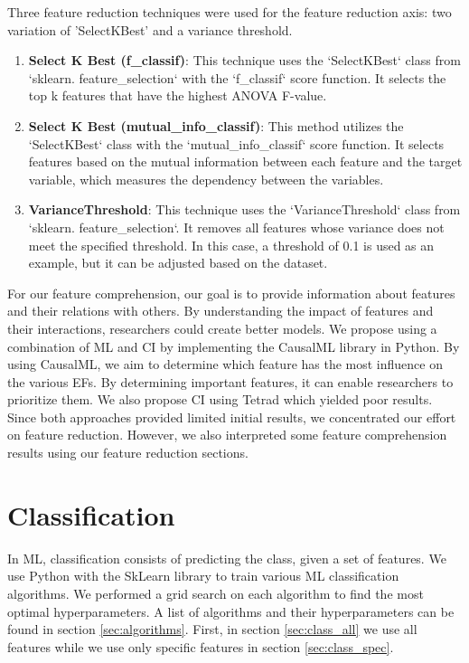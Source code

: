 \documentclass[12pt,letterpaper]{article}
\begin{document}
Three feature reduction techniques were used for the feature reduction axis: two variation of 'SelectKBest' and a variance threshold.

\begin{enumerate}
    \item \textbf{Select K Best (f\_classif)}: This technique uses the `SelectKBest` class from `sklearn. feature\_selection` with the `f\_classif` score function. It selects the top k features that have the highest ANOVA F-value.
    
    \item \textbf{Select K Best (mutual\_info\_classif)}: This method utilizes the `SelectKBest` class with the `mutual\_info\_classif` score function. It selects features based on the mutual information between each feature and the target variable, which measures the dependency between the variables.

    \item \textbf{VarianceThreshold}: This technique uses the `VarianceThreshold` class from `sklearn. feature\_selection`. It removes all features whose variance does not meet the specified threshold. In this case, a threshold of 0.1 is used as an example, but it can be adjusted based on the dataset.
\end{enumerate}



For our feature comprehension, our goal is to provide information about features and their relations with others.
By understanding the impact of features and their interactions, researchers could create better models.
We  propose using a combination of \ac{ML} and \ac{CI} by implementing the CausalML library in Python.
By using CausalML, we aim to determine which feature has the most influence on the various \ac{EF}s.
By determining important features, it can enable researchers to prioritize them.
We also propose \ac{CI} using Tetrad which yielded poor results.
Since both approaches provided limited initial results, we concentrated our effort on feature reduction.
However, we also interpreted some feature comprehension results using our feature reduction sections.

\section{Classification}\label{sec:class}
In \ac{ML}, classification consists of predicting the class, given a set of features.
We use Python with the SkLearn library to train various \ac{ML} classification algorithms.
We performed a grid search on each algorithm to find the most optimal hyperparameters.
A list of algorithms and their hyperparameters can be found in section \ref{sec:algorithms}.
First, in section \ref{sec:class_all} we use all features while we use only specific features in section \ref{sec:class_spec}.
\end{document}
